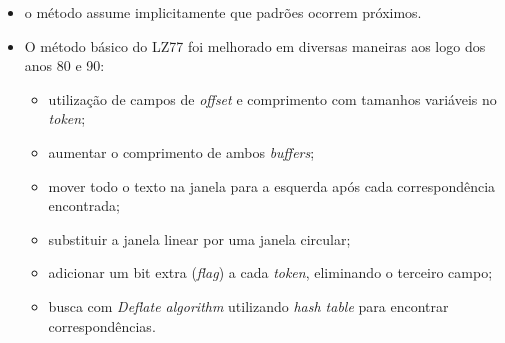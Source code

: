 \begin{frame}[allowframebreaks]
  \begin{itemize}
  \item o método assume implicitamente que padrões ocorrem próximos.
  \item O método básico do LZ77 foi melhorado em diversas maneiras aos logo dos anos 80 e 90:
        \begin{itemize}
        \item utilização de campos de \textit{offset} e comprimento com tamanhos variáveis no \textit{token};
        \item aumentar o comprimento de ambos \textit{buffers};
        \item mover todo o texto na janela para a esquerda após cada correspondência encontrada;
        \item substituir a janela linear por uma janela circular;
        \item adicionar um bit extra (\textit{flag}) a cada \textit{token}, eliminando o terceiro campo;
        \item busca com \textit{Deflate algorithm} utilizando \textit{hash table} para encontrar correspondências.
        \end{itemize}
  \end{itemize}

\end{frame}  


